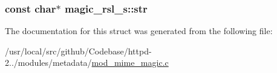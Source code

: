 \subsubsection[{\texorpdfstring{str}{str}}]{\setlength{\rightskip}{0pt plus 5cm}const char$\ast$ magic\+\_\+rsl\+\_\+s\+::str}\hypertarget{structmagic__rsl__s_a6e9fe6efeb440e5b4ad81b36a2bf232d}{}\label{structmagic__rsl__s_a6e9fe6efeb440e5b4ad81b36a2bf232d}


The documentation for this struct was generated from the following file\+:\begin{DoxyCompactItemize}
\item 
/usr/local/src/github/\+Codebase/httpd-\/2../modules/metadata/\hyperlink{mod__mime__magic_8c}{mod\+\_\+mime\+\_\+magic.\+c}\end{DoxyCompactItemize}
